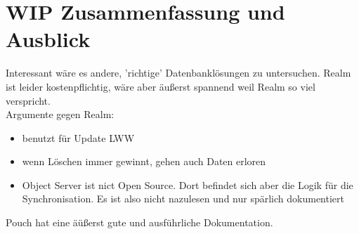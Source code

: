 \chapter{\label{chap:fazit}WIP Zusammenfassung und Ausblick}
Interessant wäre es andere, 'richtige' Datenbanklösungen zu untersuchen. 
Realm ist leider kostenpflichtig, wäre aber äußerst spannend weil Realm so viel verspricht.\\
Argumente gegen Realm:
\begin{itemize}
  \item benutzt für Update LWW
  \item wenn Löschen immer gewinnt, gehen auch Daten erloren
  \item Object Server ist nict Open Source. Dort befindet sich aber die Logik für die Synchronisation. Es ist also nicht nazulesen und nur spärlich dokumentiert
\end{itemize}
Pouch hat eine äüßerst gute und ausführliche Dokumentation.